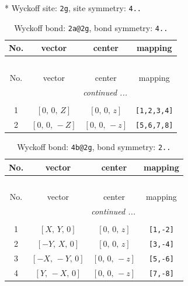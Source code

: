 \documentclass[fleqn,8pt]{jsarticle}
\begin{document}
* Wyckoff site: {\tt 2g}, site symmetry: {\tt 4..}
\renewcommand{\arraystretch}{1.2}
\begin{longtable}{cccc}
\caption{Wyckoff bond: {\tt 2a@2g}, bond symmetry: {\tt 4..}}
 \\
 \hline \hline
No. & vector & center & mapping \\ \hline \endfirsthead

\multicolumn{3}{l}{\tablename\ \thetable{}} \\
 \hline \hline
No. & vector & center & mapping \\ \hline \endhead

 \hline \hline
\multicolumn{3}{r}{\footnotesize\it continued ...} \\ \endfoot

 \hline \hline
\multicolumn{3}{r}{} \\ \endlastfoot

1 & $\left[ 0,\, 0,\, Z \right]$ & $\left[ 0,\, 0,\, z \right]$ & {\tt [1,2,3,4]} \\ \hline
2 & $\left[ 0,\, 0,\, - Z \right]$ & $\left[ 0,\, 0,\, - z \right]$ & {\tt [5,6,7,8]} \\
\end{longtable}
\renewcommand{\arraystretch}{1.2}
\begin{longtable}{cccc}
\caption{Wyckoff bond: {\tt 4b@2g}, bond symmetry: {\tt 2..}}
 \\
 \hline \hline
No. & vector & center & mapping \\ \hline \endfirsthead

\multicolumn{3}{l}{\tablename\ \thetable{}} \\
 \hline \hline
No. & vector & center & mapping \\ \hline \endhead

 \hline \hline
\multicolumn{3}{r}{\footnotesize\it continued ...} \\ \endfoot

 \hline \hline
\multicolumn{3}{r}{} \\ \endlastfoot

1 & $\left[ X,\, Y,\, 0 \right]$ & $\left[ 0,\, 0,\, z \right]$ & {\tt [1,-2]} \\ \hline
2 & $\left[ - Y,\, X,\, 0 \right]$ & $\left[ 0,\, 0,\, z \right]$ & {\tt [3,-4]} \\ \hline
3 & $\left[ - X,\, - Y,\, 0 \right]$ & $\left[ 0,\, 0,\, - z \right]$ & {\tt [5,-6]} \\ \hline
4 & $\left[ Y,\, - X,\, 0 \right]$ & $\left[ 0,\, 0,\, - z \right]$ & {\tt [7,-8]} \\
\end{longtable}
\end{document}
